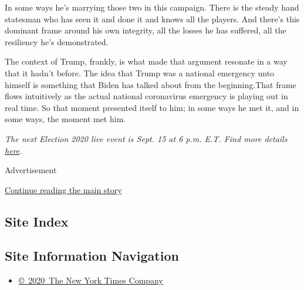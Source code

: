 In some ways he's marrying those two in this campaign. There is the
steady hand statesman who has seen it and done it and knows all the
players. And there's this dominant frame around his own integrity, all
the losses he has suffered, all the resiliency he's demonstrated.

The context of Trump, frankly, is what made that argument resonate in a
way that it hadn't before. The idea that Trump was a national emergency
unto himself is something that Biden has talked about from the
beginning.That frame flows intuitively as the actual national
coronavirus emergency is playing out in real time. So that moment
presented itself to him; in some ways he met it, and in some ways, the
moment met him.

\emph{The next Election 2020 live event is Sept. 15 at 6 p.m. E.T. Find
more details}
\href{https://election2020.splashthat.com/}{\emph{here}}\emph{.}

Advertisement

\protect\hyperlink{after-bottom}{Continue reading the main story}

\hypertarget{site-index}{%
\subsection{Site Index}\label{site-index}}

\hypertarget{site-information-navigation}{%
\subsection{Site Information
Navigation}\label{site-information-navigation}}

\begin{itemize}
\tightlist
\item
  \href{https://help.nytimes3xbfgragh.onion/hc/en-us/articles/115014792127-Copyright-notice}{©~2020~The
  New York Times Company}
\end{itemize}

